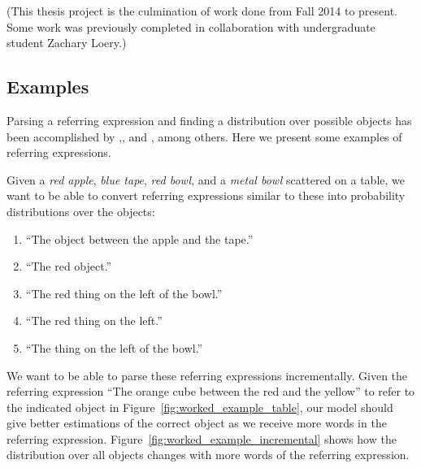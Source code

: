 \documentclass[letterpaper,10pt]{article}
\begin{document}
(This thesis project is the culmination of work done from Fall 2014 to present. Some work was previously completed in collaboration with undergraduate student Zachary Loery.)


\subsection{Examples}
Parsing a referring expression and finding a distribution over possible objects has been accomplished by \citet{tellex2011understanding},\citet{UW_RSE_ICML2012}, and \citet{artzi2013weakly}, among others. Here we present some examples of referring expressions.

Given a \textit{red apple}, \textit{blue tape}, \textit{red bowl}, and a \textit{metal bowl} scattered on a table, we want to be able to convert referring expressions similar to these into probability distributions over the objects:
\begin{enumerate}[topsep=0pt,itemsep=-1ex,partopsep=1ex,parsep=1ex]
 \item ``The object between the apple and the tape.''
 \item ``The red object.''
 \item ``The red thing on the left of the bowl.''
 \item ``The red thing on the left.''
 \item ``The thing on the left of the bowl.''
\end{enumerate}

We want to be able to parse these referring expressions incrementally. Given the referring expression ``The orange cube between the red and the yellow'' to refer to the indicated object in 
Figure~\ref{fig:worked_example_table}, our model should give better estimations of the correct object as we receive more words in the referring expression. Figure~\ref{fig:worked_example_incremental} shows how the distribution over all objects changes with more words of the referring expression.
\end{document}
